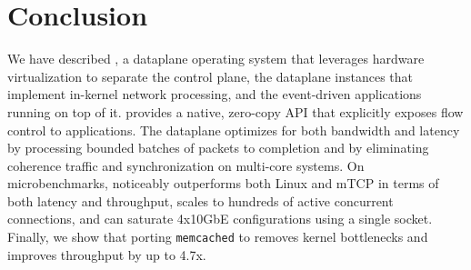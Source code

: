 
\section{Conclusion}

We have described \ix, a dataplane operating system that leverages
hardware virtualization to separate the control plane, the \ix
dataplane instances that implement in-kernel network processing, and
the event-driven applications running on top of it.  \ix provides a
native, zero-copy API that explicitly exposes flow control to
applications. The \ix dataplane optimizes for both bandwidth and
latency by processing bounded batches of packets to completion and by
eliminating coherence traffic and synchronization on multi-core
systems. On microbenchmarks, \ix noticeably outperforms both Linux and
mTCP in terms of both latency and throughput, scales to hundreds of
active concurrent connections, and can saturate 4x10GbE configurations
using a single socket.  Finally, we show that
porting \texttt{memcached} to \ix removes kernel bottlenecks and
improves throughput by up to 4.7x.


